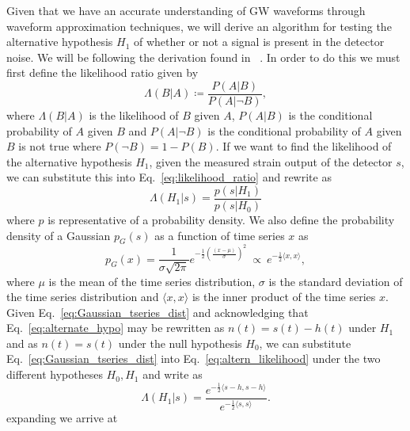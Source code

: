 %
%
Given that we have an accurate understanding 
of \ac{GW} waveforms through 
waveform approximation techniques, we will derive an algorithm 
for testing the alternative hypothesis $H_1$ of whether or not a signal is 
present in the detector noise. We will be following the derivation 
found in ~\cite{Anderson2011}. In order to do this we must 
first define the likelihood ratio given by 
%
\begin{equation}\label{eq:likelihood_ratio}
    \Lambda(B|A) \coloneqq \frac{P(A|B)}{P(A|\neg B)},
\end{equation}
%
where $\Lambda(B|A)$ is the likelihood of $B$ given $A$, 
$P(A|B)$ is the conditional probability of $A$ given $B$ 
and $P(A|\neg B)$ is the conditional probability of $A$ 
given $B$ is not true where $P(\neg B) = 1 - P(B)$.
If we want to find the likelihood of the alternative 
hypothesis $H_1$, given the measured strain output of the 
detector $s$, we can substitute this into Eq.~\ref{eq:likelihood_ratio} 
and rewrite as
%
\begin{equation}\label{eq:altern_likelihood}
 \Lambda(H_1|s) = \frac{p(s|H_1)}{p(s|H_0)}    
\end{equation}
%
where $p$ is representative of a probability density. We also define  
the probability density of a Gaussian $p_G(s)$ as a function 
of time series $x$ as 
%
\begin{equation}\label{eq:Gaussian_tseries_dist}
    p_{G}(x) = \frac{1}{\sigma\sqrt{2\pi}} 
    e^{-\frac{1}{2} \left(\frac{(x-\mu)}{\sigma}\right)^2}
    \ \propto \ e^{-\frac{1}{2}\langle x,x \rangle},
\end{equation}
%
where $\mu$ is the mean of the time series distribution, $\sigma$ is 
the standard deviation of the time series distribution and $\langle x,x\rangle$ is 
the inner product of the time series $x$. Given 
Eq.~\ref{eq:Gaussian_tseries_dist} and acknowledging 
that Eq.~\ref{eq:alternate_hypo} may be rewritten as 
$n(t) = s(t) - h(t)$ under $H_1$ and as $n(t) = s(t)$ under 
the null hypothesis $H_0$, we can substitute Eq.~\ref{eq:Gaussian_tseries_dist} 
into Eq.~\ref{eq:altern_likelihood} under the two different hypotheses 
$H_0,H_1$ and write as 
%
\begin{equation}
    \Lambda(H_1|s) = \frac{e^{-\frac{1}{2}\langle s-h,s-h \rangle}}
    {e^{-\frac{1}{2}\langle s,s\rangle}}.
\end{equation}
%
expanding we arrive at 
